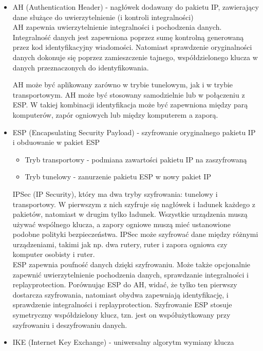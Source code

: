 \documentclass[12pt]{article}
\begin{document}
    \begin{itemize}
        \item AH (Authentication Header) - nagłówek dodawany do pakietu IP, zawierający dane służące do uwierzytelnienie (i kontroli integralności)\\
        AH zapewnia uwierzytelnienie integralności i pochodzenia danych. Integralność danych jest zapewniona poprzez sumę kontrolną generowaną przez kod identyfikacyjny wiadomości. Natomiast sprawdzenie oryginalności danych dokonuje się poprzez zamieszczenie tajnego, współdzielonego klucza w danych przeznaczonych do identyfikowania.

        AH może być aplikowany zarówno w trybie tunelowym, jak i w trybie transportowym. AH może być stosowany samodzielnie lub w połączeniu z ESP. W takiej kombinacji identyfikacja może być zapewniona między parą komputerów, zapór ogniowych lub między komputerem a zaporą.

        \item ESP (Encapsulating Security Payload) - szyfrowanie oryginalnego pakietu IP i obduowanie w pakiet ESP
        \begin{itemize}
            \item Tryb transportowy - podmiana zawartości pakietu IP na zaszyfrowaną
            \item Tryb tunelowy - zanurzenie pakietu ESP w nowy pakiet IP
        \end{itemize}
        IPSec (IP Security), który ma dwa tryby szyfrowania: tunelowy i transportowy. W pierwszym z nich szyfruje się nagłówek i ładunek każdego z pakietów, natomiast w drugim tylko ładunek. Wszystkie urządzenia muszą używać wspólnego klucza, a zapory ogniowe muszą mieć ustanowione podobne polityki bezpieczeństwa. IPSec może szyfrować dane między różnymi urządzeniami, takimi jak np. dwa rutery, ruter i zapora ogniowa czy komputer osobisty i ruter.\\
        
        ESP zapewnia poufność danych dzięki szyfrowaniu. Może także opcjonalnie zapewnić uwierzytelnienie pochodzenia danych, sprawdzanie integralności i replayprotection. Porównując ESP do AH, widać, że tylko ten pierwszy dostarcza szyfrowania, natomiast obydwa zapewniają identyfikację, i sprawdzenie integralności i replayprotection. Szyfrowanie ESP stosuje symetryczny współdzielony klucz, tzn. jest on współużytkowany przy szyfrowaniu i deszyfrowaniu danych.
        \item IKE (Internet Key Exchange) - uniwersalny algorytm wymiany klucza
    \end{itemize}
\end{document}
